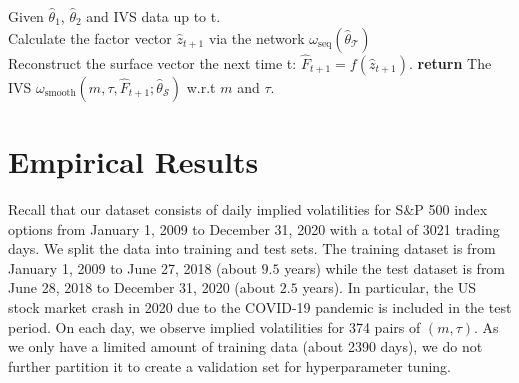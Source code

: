 \documentclass[11pt,a4paper]{article}
\theoremstyle{remark}
\begin{document}
\begin{algorithm}[tb]
\caption{Predict time t+1 IVS}
\label{alg:algorithm}
\begin{algorithmic}[1]
\STATE Given $\hat{\theta}_1$, $\hat{\theta}_2$ and IVS data up to t. \\
\STATE Calculate the factor vector $\hat{z}_{t+1} $ via the network $\omega_{\mathrm{seq}}\left(\hat{\theta}_{\mathcal{T}}\right)$ \\
\STATE Reconstruct the surface vector the next time t: $\hat{F}_{t+1} = f(\hat{z}_{t+1})$.
\STATE \textbf{return} The IVS $\omega_{\mathrm{smooth}}\left(m, \tau, \hat{F}_{t+1} ; \hat{\theta}_{\mathcal{S}}\right)$ w.r.t $m$ and $\tau$.
\end{algorithmic}
\end{algorithm}
\fi

\section{Empirical Results}\label{sec:empirical}
Recall that our dataset consists of daily implied volatilities for  S$\&$P 500 index options from January 1, 2009 to December 31, 2020 with a total of 3021 trading days. We split the data into training and test sets. The training dataset is from January 1, 2009 to June 27, 2018 (about $9.5$ years) while the test dataset is from June 28, 2018 to December 31, 2020 (about $2.5$ years). In particular, the US stock market crash in 2020 due to the COVID-19 pandemic is included in the test period. On each day, we observe implied volatilities for 374 pairs of $(m,\tau)$. As we only have a limited amount of training data (about 2390 days), we do not further partition it to create a validation set for hyperparameter tuning.
\end{document}
